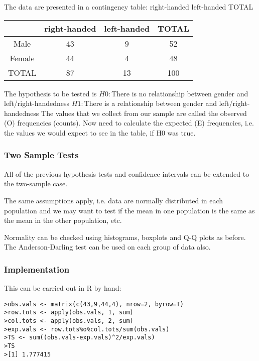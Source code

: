 \begin{itemize}
The data are presented in a contingency table:
right-handed left-handed TOTAL

\begin{tabular}{|c|c|c|c|}
\hline
& right-handed &left-handed & TOTAL\\\hline
Male & 43 & 9 & 52 \\
Female & 44 & 4 & 48 \\
TOTAL & 87 & 13 & 100 \\
\hline
\end{tabular}


The hypothesis to be tested is
$H0 :$There is no relationship between gender and left/right-handedness
$H1 :$There is a relationship between gender and left/right-handedness
The values that we collect from our sample are called the observed
(O) frequencies (counts). Now need to calculate the expected (E)
frequencies, i.e. the values we would expect to see in the table, if
H0 was true.






\subsubsection{Two Sample Tests}


All of the previous hypothesis tests and confidence intervals can be
extended to the two-sample case.

The same assumptions apply, i.e. data are normally distributed in
each population and we may want to test if the mean in one
population is the same as the mean in the other population, etc.

Normality can be checked using histograms, boxplots and Q-Q
plots as before. The Anderson-Darling test can be used on
each group of data also.


\subsubsection{Implementation}

This can be carried out in R by hand:

\large \begin{verbatim}
>obs.vals <- matrix(c(43,9,44,4), nrow=2, byrow=T)
>row.tots <- apply(obs.vals, 1, sum)
>col.tots <- apply(obs.vals, 2, sum)
>exp.vals <- row.tots%o%col.tots/sum(obs.vals)
>TS <- sum((obs.vals-exp.vals)^2/exp.vals)
>TS
>[1] 1.777415
\end{verbatim}\large



\end{itemize}
